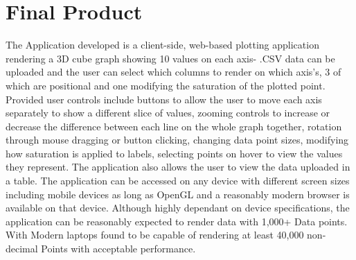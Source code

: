 \section{Final Product}
The Application developed is a client-side, web-based plotting application rendering a 3D cube graph showing 10 values on each axis- .CSV data can be uploaded and the user can select which columns to render on which axis's, 3 of which are positional and one modifying the saturation of the plotted point.
Provided user controls include buttons to allow the user to move each axis separately to show a different slice of values, zooming controls to increase or decrease the difference between each line on the whole graph together, rotation through mouse dragging or button clicking, changing data point sizes, modifying how saturation is applied to labels, selecting points on hover to view the values they represent. The application also allows the user to view the data uploaded in a table.
The application can be accessed on any device with different screen sizes including mobile devices as long as OpenGL and a reasonably modern browser is available on that device. Although highly dependant on device specifications, the application can be reasonably expected to render data with 1,000+ Data points. With Modern laptops found to be capable of rendering at least 40,000 non-decimal Points with acceptable performance.